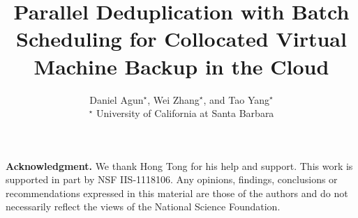 \documentclass[finalversion]{usetex-v1}
\begin{document}
\title{Parallel Deduplication with Batch  Scheduling for  Collocated Virtual Machine Backup in the Cloud}

\author{
Daniel Agun$^{\star}$,  
Wei Zhang$^{\star}$, and Tao Yang$^\star$ \\
{\normalsize$^\star$  University of California at Santa Barbara} 
}


\date{}
\maketitle



%
%
%



{\bf Acknowledgment.} We thank Hong Tong for his help and support.
This work is supported in part by NSF IIS-1118106. 
Any opinions, findings, conclusions or recommendations expressed in this material
are those of the authors and
do not necessarily reflect the views of the National Science Foundation.




{\small


}
\end{document}
